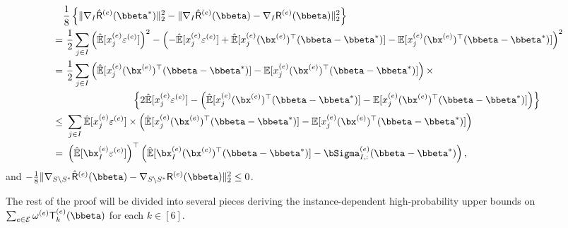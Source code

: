 \documentclass[10pt]{article}
\numberwithin{equation}{section}
\begin{document}
\begin{align*}
	&\frac{1}{8}\left\{\|\nabla_{I} \hat{\mathsf{R}}^{(e)}(\bbeta^*)\|_2^2 - \|\nabla_{I} \hat{\mathsf{R}}^{(e)}(\bbeta) - \nabla_{I} {\mathsf{R}}^{(e)}(\bbeta)\|_2^2\right\} \\
	=& ~\frac{1}{2} \sum_{j\in I} \left(\hat{\mathbb{E}}[x_j^{(e)} \varepsilon^{(e)}] \right)^2 - \left(- \hat{\mathbb{E}}[x_j^{(e)} \varepsilon^{(e)}] + \hat{\mathbb{E}}[x_j^{(e)} (\bx^{(e)})^\top (\bbeta - \bbeta^*)] - {\mathbb{E}}[x_j^{(e)} (\bx^{(e)})^\top (\bbeta - \bbeta^*)]\right)^2\\
	=& ~\frac{1}{2} \sum_{j \in I} \left(\hat{\mathbb{E}}[x_j^{(e)} (\bx^{(e)})^\top (\bbeta - \bbeta^*)] - {\mathbb{E}}[x_j^{(e)} (\bx^{(e)})^\top (\bbeta - \bbeta^*)]\right) \times \\
	&~~~~~~~~~~~~~~~~~~~~~ \left\{2\hat{\mathbb{E}}[x_j^{(e)} \varepsilon^{(e)}] -\left(\hat{\mathbb{E}}[x_j^{(e)} (\bx^{(e)})^\top (\bbeta - \bbeta^*)] - {\mathbb{E}}[x_j^{(e)} (\bx^{(e)})^\top (\bbeta - \bbeta^*)]\right)\right\} \\
	\le& ~ \sum_{j\in I} \hat{\mathbb{E}}[x_j^{(e)} \varepsilon^{(e)}] \times \left(\hat{\mathbb{E}}[x_j^{(e)} (\bx^{(e)})^\top (\bbeta - \bbeta^*)] - {\mathbb{E}}[x_j^{(e)} (\bx^{(e)})^\top (\bbeta - \bbeta^*)]\right) \\
	=& ~\left(\hat{\mathbb{E}}[\bx_{I}^{(e)} \varepsilon^{(e)}] \right)^\top \left(\hat{\mathbb{E}} [\bx_{I}^{(e)} (\bx^{(e)})^\top (\bbeta - \bbeta^*)] - \bSigma^{(e)}_{I,:} (\bbeta - \bbeta^*)\right),
\end{align*} and $-\frac{1}{8} \|\nabla_{S\setminus S^*} \hat{\mathsf{R}}^{(e)}(\bbeta) - \nabla_{S\setminus S^*} {\mathsf{R}}^{(e)}(\bbeta)\|_2^2 \le 0$.



The rest of the proof will be divided into several pieces deriving the instance-dependent high-probability upper bounds on $\sum_{e\in \mathcal{E}} \omega^{(e)} \mathsf{T}_k^{(e)}(\bbeta)$ for each $k\in [6]$.
\end{document}
